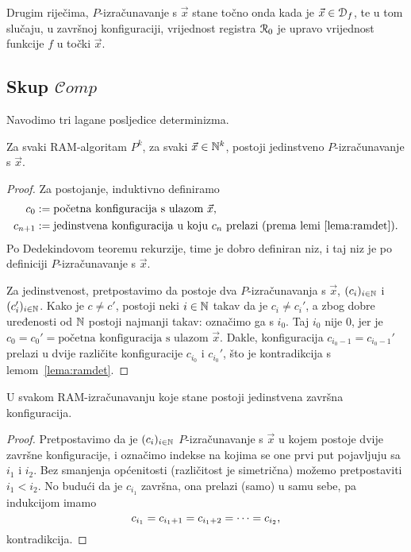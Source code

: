 Drugim riječima, $P$-izračunavanje s $\vec x$ stane točno onda kada je $\vec x\in\mathcal D_{f}$, te u tom slučaju, u završnoj konfiguraciji, vrijednost registra $\mathcal R_{0}$ je upravo vrijednost funkcije $f$ u točki $\vec x$.

\subsection{Skup \texorpdfstring{$\mathcal Comp$}{Comp}}

Navodimo tri lagane posljedice determinizma.

\begin{propozicija}\label{prop:ramdet}
Za svaki RAM-algoritam $P^k$, za svaki $\vec x\in{\mathbb N}^k$, postoji jedinstveno $P$-izračunavanje s $\vec x$.
\end{propozicija}
\begin{proof}
Za postojanje, induktivno definiramo
\begin{align}
    c_0&:=\text{početna konfiguracija s ulazom $\vec x$,}\\
    c_{n+1}&:=\text{jedinstvena konfiguracija u koju $c_n$ prelazi (prema lemi~\ref{lema:ramdet}).}
\end{align}
Po Dedekindovom teoremu rekurzije, time je dobro definiran niz, i taj niz je po definiciji $P$-iz\-ra\-ču\-na\-va\-nje s $\vec x$.

Za jedinstvenost, pretpostavimo da postoje dva $P$-izračunavanja s $\vec x$, $(c_i)_{i\in{\mathbb N}}$ i $(c_i')_{i\in{\mathbb N}}$.
Kako je $c\not=c'$, postoji neki $i\in{\mathbb N}$ takav da je $c_i\not=c_i'$, a zbog dobre uređenosti od ${\mathbb N}$ postoji najmanji takav: označimo ga s $i_0$.
Taj $i_0$ nije $0$, jer je $c_0=c_0'=\text{početna konfiguracija s ulazom $\vec x$}$. Dakle, konfiguracija $c_{i_0-1}=c_{i_0-1}'$ prelazi u dvije različite konfiguracije $c_{i_0}$ i $c_{i_0}'$, što je kontradikcija s lemom~\ref{lema:ramdet}.
\end{proof}

\begin{propozicija}\label{prop:ram1zav}
U svakom RAM-izračunavanju koje stane postoji jedinstvena za\-vrš\-na konfiguracija.
\end{propozicija}
\begin{proof}
Pretpostavimo da je $(c_i)_{i\in{\mathbb N}}$ $P$-izračunavanje s $\vec x$ u kojem postoje dvije završne konfiguracije, i označimo indekse na kojima se one prvi put pojavljuju sa $i_1$ i $i_2$. Bez smanjenja općenitosti (različitost je simetrična) možemo pretpostaviti $i_1<i_2$. No budući da je $c_{i_1}$ završna, ona prelazi (samo) u samu sebe, pa indukcijom imamo
\begin{equation}
    c_{i_1}=c_{i_1+1}=c_{i_1+2}=\dotsb=c_{i_2}\text,
\end{equation}
kontradikcija.
\end{proof}

